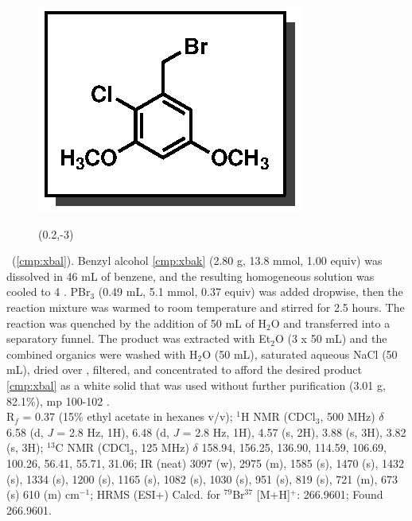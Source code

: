 \vspace{10pt}
\begin{figure}
  \vspace{-25pt}
  \begin{center}
    \includegraphics[scale=0.8]{chp_singlecarbon/images/xbal}
    \begin{textblock}{1}(0.2,-3)  \end{textblock}
  \end{center}
  \vspace{-30pt}
\end{figure}\noindent \textbf{\CMPxbal}\ (\ref{cmp:xbal}). Benzyl
alcohol \ref{cmp:xbak} (2.80 g, 13.8 mmol, 1.00 equiv) was dissolved in 46 mL of
benzene, and the resulting homogeneous solution was cooled to 4 \degc.
PBr$_3$ (0.49 mL, 5.1 mmol, 0.37 equiv) was added dropwise,  then the
reaction mixture was warmed to room temperature and stirred for 2.5 hours. The reaction was
quenched by the addition of 50 mL of H$_2$O and transferred into a separatory funnel.
The product was extracted with Et$_2$O (3 x 50 mL) and the combined organics were washed with
H$_2$O (50 mL), saturated aqueous NaCl (50 mL), dried over , filtered, and concentrated
to afford the desired product \ref{cmp:xbal} as a white solid that was used without further
purification (3.01 g, 82.1\%), mp 100-102 \degc.\\
R$_f$ = 0.37 (15\% ethyl acetate in hexanes v/v); $^1$H NMR (CDCl$_3$, 500 MHz) $\delta$ 6.58 (d, \textit{J} = 2.8 Hz, 1H),
6.48 (d, \textit{J} = 2.8 Hz, 1H), 4.57 (s, 2H), 3.88 (s, 3H), 3.82 (s, 3H); $^{13}$C NMR (CDCl$_3$, 125
MHz) $\delta$ 158.94, 156.25, 136.90, 114.59, 106.69, 100.26, 56.41, 55.71, 31.06; IR (neat) 3097 (w),
2975 (m), 1585 (s), 1470 (s), 1432 (s), 1334 (s), 1200 (s), 1165 (s), 1082 (s), 1030 (s), 951 (s),
819 (s), 721 (m), 673 (s) 610 (m) cm$^{-1}$; HRMS (ESI+) Calcd. for
$^{79}$Br$^{37}$ [M+H]$^+$: 266.9601; Found 266.9601.

